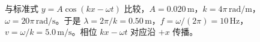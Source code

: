 与标准式 $y=A\cos(kx-\omega t)$ 比较，$A=0.020\,\mathrm m$，$k=4\pi\,\mathrm{rad/m}$，$\omega=20\pi\,\mathrm{rad/s}$。于是 $\lambda=2\pi/k=0.50\,\mathrm m$，$f=\omega/(2\pi)=10\,\mathrm{Hz}$，$v=\omega/k=5.0\,\mathrm{m/s}$。相位 $kx-\omega t$ 对应沿 $+x$ 传播。
